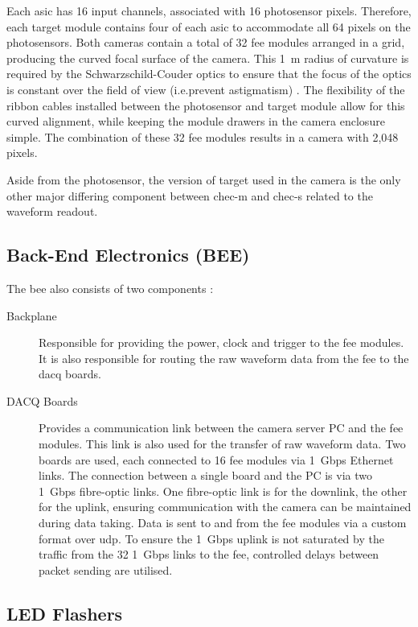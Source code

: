 Each \gls{asic} has 16 input channels, associated with 16 photosensor pixels. Therefore, each \gls{target} module contains four of each \gls{asic} to accommodate all 64 pixels on the photosensors. Both cameras contain a total of 32 \gls{fee} modules arranged in a grid, producing the curved focal surface of the camera. This \SI{1}{m} radius of curvature is required by the Schwarzschild-Couder optics to ensure that the focus of the optics is constant over the field of view (i.e.\@ prevent astigmatism) \cite{Vassiliev2007}. The flexibility of the ribbon cables installed between the photosensor and \gls{target} module allow for this curved alignment, while keeping the module drawers in the camera enclosure simple. The combination of these 32 \gls{fee} modules results in a camera with 2,048 pixels.

Aside from the photosensor, the version of \gls{target} used in the camera is the only other major differing component between \gls{chec-m} and \gls{chec-s} related to the waveform readout. 

\subsection{Back-End Electronics (BEE)} \label{section:bee}

The \gls{bee} also consists of two components \cite{Zorn2017}:
\begin{description}
\item [Backplane] Responsible for providing the power, clock and trigger to the \gls{fee} modules. It is also responsible for routing the raw waveform data from the \gls{fee} to the \gls{dacq} boards. 
\item [DACQ Boards] Provides a communication link between the camera server PC and the \gls{fee} modules. This link is also used for the transfer of raw waveform data. Two boards are used, each connected to 16 \gls{fee} modules via \SI{1}{Gbps} Ethernet links. The connection between a single board and the PC is via two \SI{1}{Gbps} fibre-optic links. One fibre-optic link is for the downlink, the other for the uplink, ensuring communication with the camera can be maintained during data taking. Data is sent to and from the \gls{fee} modules via a custom format over \gls{udp}. To ensure the \SI{1}{Gbps} uplink is not saturated by the traffic from the 32 \SI{1}{Gbps} links to the \gls{fee}, controlled delays between packet sending are utilised.
\end{description}

\subsection{LED Flashers} \label{section:led_flashers}

